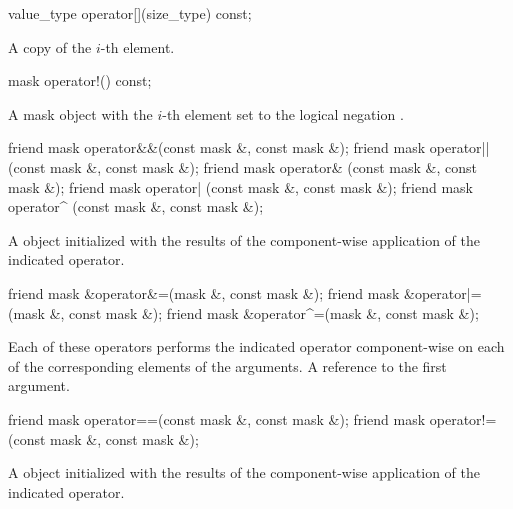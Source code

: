\begin{itemdecl}
value_type operator[](size_type) const;
\end{itemdecl}
\begin{itemdescr}
  \pnum\returns A copy of the $i$-th element.
\end{itemdescr}

\begin{itemdecl}
mask operator!() const;
\end{itemdecl}
\begin{itemdescr}
  \pnum\returns A mask object with the $i$-th element set to the logical negation \foralli.
\end{itemdescr}


\begin{itemdecl}
friend mask operator&&(const mask &, const mask &);
friend mask operator||(const mask &, const mask &);
friend mask operator& (const mask &, const mask &);
friend mask operator| (const mask &, const mask &);
friend mask operator^ (const mask &, const mask &);
\end{itemdecl}
\begin{itemdescr}
  \pnum\returns A \mask object initialized with the results of the component-wise application of the indicated operator.
\end{itemdescr}

\begin{itemdecl}
friend mask &operator&=(mask &, const mask &);
friend mask &operator|=(mask &, const mask &);
friend mask &operator^=(mask &, const mask &);
\end{itemdecl}
\begin{itemdescr}
  \pnum\effects Each of these operators performs the indicated operator component-wise on each of the corresponding elements of the arguments.
  \pnum\returns A reference to the first argument.
\end{itemdescr}

\begin{itemdecl}
friend mask operator==(const mask &, const mask &);
friend mask operator!=(const mask &, const mask &);
\end{itemdecl}
\begin{itemdescr}
  \pnum\returns A \mask object initialized with the results of the component-wise application of the indicated operator.
\end{itemdescr}

